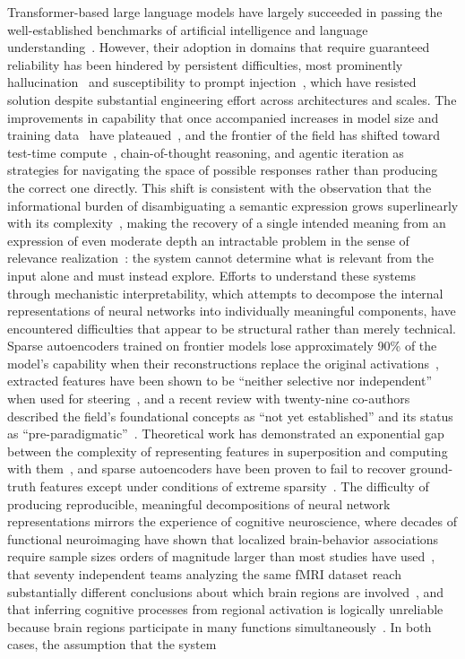 \documentclass[aps,prl,twocolumn,superscriptaddress,amsmath,amssymb]{revtex4-2}
\begin{document}
Transformer-based large language models have largely succeeded in passing the well-established benchmarks of artificial intelligence and language understanding~\cite{brown2020language}. However, their adoption in domains that require guaranteed reliability has been hindered by persistent difficulties, most prominently hallucination~\cite{huang2023survey,ji2023survey} and susceptibility to prompt injection~\cite{perez2022ignore,greshake2023not}, which have resisted solution despite substantial engineering effort across architectures and scales. The improvements in capability that once accompanied increases in model size and training data~\cite{kaplan2020scaling,hoffmann2022training} have plateaued~\cite{muennighoff2025scaling,villalobos2025scaling}, and the frontier of the field has shifted toward test-time compute~\cite{snell2024scaling}, chain-of-thought reasoning, and agentic iteration as strategies for navigating the space of possible responses rather than producing the correct one directly. This shift is consistent with the observation that the informational burden of disambiguating a semantic expression grows superlinearly with its complexity~\cite{agostino2025quantum}, making the recovery of a single intended meaning from an expression of even moderate depth an intractable problem in the sense of relevance realization~\cite{vervaeke2013,jaeger2023}: the system cannot determine what is relevant from the input alone and must instead explore. Efforts to understand these systems through mechanistic interpretability, which attempts to decompose the internal representations of neural networks into individually meaningful components, have encountered difficulties that appear to be structural rather than merely technical. Sparse autoencoders trained on frontier models lose approximately 90\% of the model's capability when their reconstructions replace the original activations~\cite{gao2024scaling_sae}, extracted features have been shown to be ``neither selective nor independent'' when used for steering~\cite{mueller2024isolation}, and a recent review with twenty-nine co-authors described the field's foundational concepts as ``not yet established'' and its status as ``pre-paradigmatic''~\cite{sharkey2025open}. Theoretical work has demonstrated an exponential gap between the complexity of representing features in superposition and computing with them~\cite{adler2024complexity}, and sparse autoencoders have been proven to fail to recover ground-truth features except under conditions of extreme sparsity~\cite{cui2025limits}. The difficulty of producing reproducible, meaningful decompositions of neural network representations mirrors the experience of cognitive neuroscience, where decades of functional neuroimaging have shown that localized brain-behavior associations require sample sizes orders of magnitude larger than most studies have used~\cite{marek2022reproducible}, that seventy independent teams analyzing the same fMRI dataset reach substantially different conclusions about which brain regions are involved~\cite{botvinik2020variability}, and that inferring cognitive processes from regional activation is logically unreliable because brain regions participate in many functions simultaneously~\cite{poldrack2006can,button2013power}. In both cases, the assumption that the system 
\end{document}
